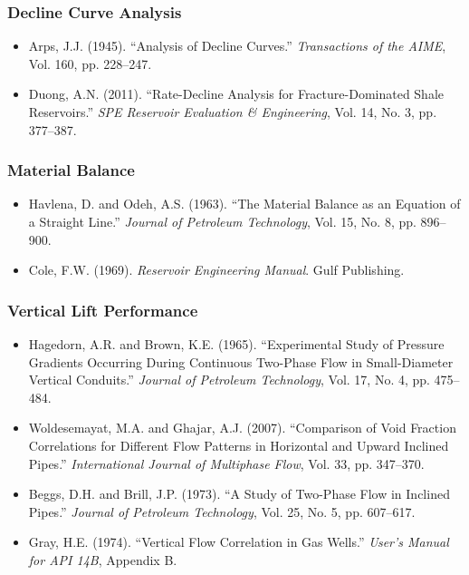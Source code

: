\documentclass[11pt,a4paper]{article}
\begin{document}
\subsubsection{Decline Curve Analysis}
\begin{itemize}
\item Arps, J.J. (1945). ``Analysis of Decline Curves.'' \textit{Transactions of the AIME}, Vol. 160, pp. 228--247.
\item Duong, A.N. (2011). ``Rate-Decline Analysis for Fracture-Dominated Shale Reservoirs.'' \textit{SPE Reservoir Evaluation \& Engineering}, Vol. 14, No. 3, pp. 377--387.
\end{itemize}

\subsubsection{Material Balance}
\begin{itemize}
\item Havlena, D. and Odeh, A.S. (1963). ``The Material Balance as an Equation of a Straight Line.'' \textit{Journal of Petroleum Technology}, Vol. 15, No. 8, pp. 896--900.
\item Cole, F.W. (1969). \textit{Reservoir Engineering Manual}. Gulf Publishing.
\end{itemize}

\subsubsection{Vertical Lift Performance}
\begin{itemize}
\item Hagedorn, A.R. and Brown, K.E. (1965). ``Experimental Study of Pressure Gradients Occurring During Continuous Two-Phase Flow in Small-Diameter Vertical Conduits.'' \textit{Journal of Petroleum Technology}, Vol. 17, No. 4, pp. 475--484.
\item Woldesemayat, M.A. and Ghajar, A.J. (2007). ``Comparison of Void Fraction Correlations for Different Flow Patterns in Horizontal and Upward Inclined Pipes.'' \textit{International Journal of Multiphase Flow}, Vol. 33, pp. 347--370.
\item Beggs, D.H. and Brill, J.P. (1973). ``A Study of Two-Phase Flow in Inclined Pipes.'' \textit{Journal of Petroleum Technology}, Vol. 25, No. 5, pp. 607--617.
\item Gray, H.E. (1974). ``Vertical Flow Correlation in Gas Wells.'' \textit{User's Manual for API 14B}, Appendix B.
\end{itemize}
\end{document}
